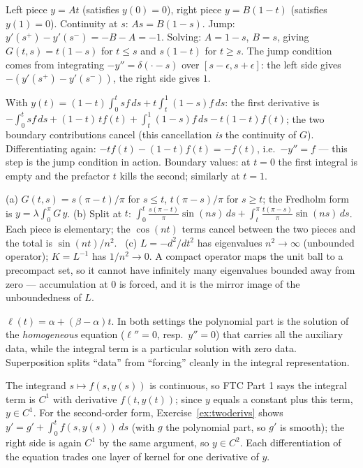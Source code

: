 \documentclass{essay}
\begin{document}
\begin{description}[leftmargin=0pt, itemsep=6pt]
\item[\ref{ex:green-construct}.] Left piece $y = At$ (satisfies $y(0)=0$), right piece $y = B(1-t)$ (satisfies $y(1)=0$). Continuity at $s$: $As = B(1-s)$. Jump: $y'(s^+) - y'(s^-) = -B - A = -1$. Solving: $A = 1 - s$, $B = s$, giving $G(t,s) = t(1-s)$ for $t \le s$ and $s(1-t)$ for $t \ge s$. The jump condition comes from integrating $-y'' = \delta(\cdot - s)$ over $[s - \epsilon, s + \epsilon]$: the left side gives $-(y'(s^+) - y'(s^-))$, the right side gives $1$.

\item[\ref{ex:green-verify}.] With $y(t) = (1-t)\int_0^t s f\,ds + t\int_t^1 (1-s) f\,ds$: the first derivative is $-\int_0^t s f\,ds + (1-t)\,t f(t) + \int_t^1 (1-s)f\,ds - t(1-t)f(t)$; the two boundary contributions cancel (this cancellation \emph{is} the continuity of $G$). Differentiating again: $-t f(t) - (1-t) f(t) = -f(t)$, i.e.\ $-y'' = f$ --- this step is the jump condition in action. Boundary values: at $t=0$ the first integral is empty and the prefactor $t$ kills the second; similarly at $t = 1$.

\item[\ref{ex:eigen}.] (a) $G(t,s) = s(\pi - t)/\pi$ for $s \le t$, $t(\pi - s)/\pi$ for $s \ge t$; the Fredholm form is $y = \lambda \int_0^\pi G\, y$. (b) Split at $t$:
$\int_0^t \frac{s(\pi - t)}{\pi}\sin(ns)\,ds + \int_t^\pi \frac{t(\pi - s)}{\pi}\sin(ns)\,ds$. Each piece is elementary; the $\cos(nt)$ terms cancel between the two pieces and the total is $\sin(nt)/n^2$. \checkmark\ (c) $L = -d^2/dt^2$ has eigenvalues $n^2 \to \infty$ (unbounded operator); $K = L^{-1}$ has $1/n^2 \to 0$. A compact operator maps the unit ball to a precompact set, so it cannot have infinitely many eigenvalues bounded away from zero --- accumulation at $0$ is forced, and it is the mirror image of the unboundedness of $L$.

\item[\ref{ex:inhomog-bc}.] $\ell(t) = \alpha + (\beta - \alpha)t$. In both settings the polynomial part is the solution of the \emph{homogeneous} equation ($\ell'' = 0$, resp.\ $y'' = 0$) that carries all the auxiliary data, while the integral term is a particular solution with zero data. Superposition splits ``data'' from ``forcing'' cleanly in the integral representation.

\item[\ref{ex:bootstrap}.] The integrand $s \mapsto f(s, y(s))$ is continuous, so FTC Part 1 says the integral term is $C^1$ with derivative $f(t, y(t))$; since $y$ equals a constant plus this term, $y \in C^1$. For the second-order form, Exercise~\ref{ex:twoderivs} shows $y' = g' + \int_0^t f(s,y(s))\,ds$ (with $g$ the polynomial part, so $g' $ is smooth); the right side is again $C^1$ by the same argument, so $y \in C^2$. Each differentiation of the equation trades one layer of kernel for one derivative of $y$.


\end{description}
\end{document}
